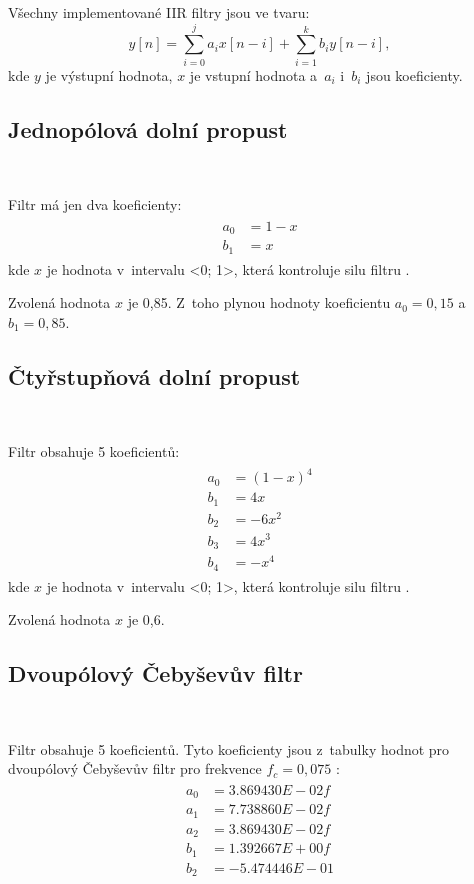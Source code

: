 Všechny implementované IIR filtry jsou ve tvaru:
\begin{equation}
y[n] = \sum_{i = 0}^{j}a_{i}x[n - i] + \sum_{i = 1}^{k}b_{i}y[n - i],
\end{equation}
kde $y$ je výstupní hodnota, $x$ je vstupní hodnota a~$a_i$ i~$b_i$ jsou
koeficienty.

\subsection{Jednopólová dolní propust}\

Filtr má jen dva koeficienty:
\begin{align}
\begin{split}
a_0 &= 1 - x \\
b_1 &= x
\end{split}
\end{align}
kde $x$ je hodnota v~intervalu <0; 1>, která kontroluje silu filtru \cite{Filters}.

Zvolená hodnota $x$ je 0,85. Z~toho plynou hodnoty koeficientu $a_0 = 0,15$ a~$b_1 =
0,85$.

\subsection{Čtyřstupňová dolní propust}\

Filtr obsahuje 5 koeficientů:
\begin{align}
\begin{split}
a_0 &= (1 - x)^4 \\
b_1 &= 4x \\
b_2 &= -6x^2 \\
b_3 &= 4x^3 \\
b_4 &= -x^4
\end{split}
\end{align}
kde $x$ je hodnota v~intervalu <0; 1>, která kontroluje silu filtru \cite{Filters}.

Zvolená hodnota $x$ je 0,6.

\subsection{Dvoupólový Čebyševův filtr}\

Filtr obsahuje 5 koeficientů. Tyto koeficienty jsou z~tabulky hodnot pro dvoupólový
Čebyševův filtr pro frekvence $f_c = 0,075$ \cite{Filters}:
\begin{align}
\begin{split}
a_0 &= 3.869430E-02f \\
a_1 &= 7.738860E-02f \\
a_2 &= 3.869430E-02f \\
b_1 &= 1.392667E+00f \\
b_2 &= -5.474446E-01 \\
\end{split}
\end{align}


